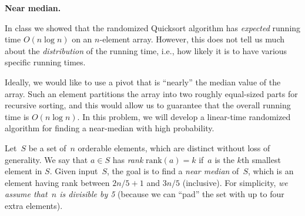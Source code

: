 \documentclass[11pt,addpoints,answers]{exam}
\begin{document}
\begin{questions}
  \question \textbf{Near median.}
  \nopagebreak
  \newcommand{\rank}{\text{rank}}

  In class we showed that the randomized Quicksort algorithm has \emph{expected} running time $O(n \log n)$ on an $n$-element array.
  However, this does not tell us much about the \emph{distribution} of the running time, i.e., how likely it is to have various specific running times.
    
  Ideally, we would like to use a pivot that is ``nearly'' the median value of the array.
  Such an element partitions the array into two roughly equal-sized parts for recursive sorting, and this would allow us to guarantee that the overall running time is $O(n \log n)$.
  In this problem, we will develop a linear-time randomized algorithm for finding a near-median with high probability.

  Let~$S$ be a set of~$n$ orderable elements, which are distinct without loss of generality.
  We say that $a\in S$ has \emph{rank} $\rank(a)=k$ if~$a$ is the $k$th smallest element in $S$.
  Given input~$S$, the goal is to find a \emph{near median} of~$S$, which is an element having rank between $2n/5+1$ and $3n/5$ (inclusive).
  For simplicity, \emph{we assume that~$n$ is divisible by 5} (because we can ``pad'' the set with up to four extra elements).
  
\end{questions}
\end{document}
